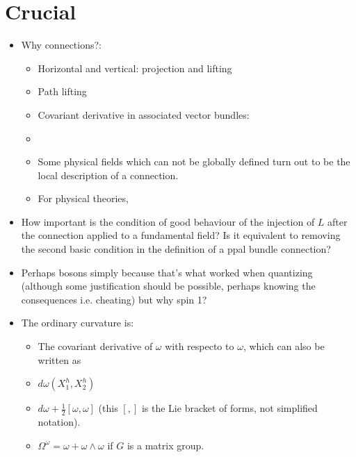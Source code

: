 \section{Crucial}
\begin{itemize}
    \item Why connections?:
    \begin{itemize}
        \item Horizontal and vertical: projection and lifting
        
        \item Path lifting
        
        \item Covariant derivative in associated vector bundles:
        
        \item {}
        
        \item Some physical fields which can not be globally defined turn out to be the local description of a connection.  
        
        \item For  physical theories, 
    \end{itemize}
    
    \item How important is the condition of good behaviour of the injection of $L$ after the connection applied to a fundamental field? Is it equivalent to removing the second basic condition in the definition of a ppal bundle connection?
    
    \item {} Perhaps bosons simply because that's what worked when quantizing (although some justification should be possible, perhaps knowing the consequences i.e. cheating) but why spin 1?
    
    \item The ordinary curvature is:
    \begin{itemize}
        \item The covariant derivative of $\omega$ with respecto to $\omega$, which can also be written as
        \item $d\omega(X_1^h, X_2^h)$
        \item $d\omega + \frac{1}{2}[\omega,\omega]$ (this $[,]$ is the Lie bracket of forms, not simplified notation).
        \item $\Omega^\omega = \omega + \omega \wedge \omega$ if $G$ is a matrix group.
    \end{itemize}
    

\end{itemize}
